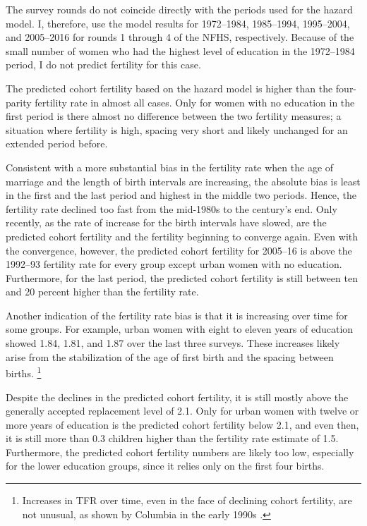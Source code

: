 \documentclass[12pt,letterpaper]{article}
\begin{document}
The survey rounds do not coincide directly with the periods used for the hazard model.
I, therefore, use the model results for 1972--1984, 1985--1994, 1995--2004,
and 2005--2016 for rounds 1 through 4 of the NFHS, respectively.
Because of the small number of women who had the highest level of education in the
1972--1984 period, I do not predict fertility for this case.

The predicted cohort fertility based on the hazard model is higher than the four-parity 
fertility rate in almost all cases.
Only for women with no education in the first period is there almost no difference 
between the two fertility measures; a situation where fertility is high, spacing
very short and likely unchanged for an extended period before.

Consistent with a more substantial bias in the fertility rate when the age of marriage 
and the length of birth intervals are increasing, the absolute bias is least in the first and the last 
period and highest in the middle two periods.
Hence, the fertility rate declined too fast from the mid-1980s to the century's end.
Only recently, as the rate of increase for the birth intervals have
slowed, are the predicted cohort fertility and the fertility beginning
to converge again.
Even with the convergence, however, the predicted cohort fertility for 2005--16 is 
above the 1992--93 fertility rate for every group except urban women with no education.
Furthermore, for the last period, the predicted cohort fertility is still between ten
and 20 percent higher than the fertility rate. 

Another indication of the fertility rate bias is that it is increasing over time for some 
groups.
For example, urban women with eight to eleven years of education showed 1.84, 1.81, and
1.87 over the last three surveys.
These increases likely arise from the stabilization of the age of first birth and the 
spacing between births.%
\footnote{
Increases in TFR over time, even in the face of declining cohort fertility, are not 
unusual, as shown by Columbia in the early 1990s \citep{Bongaarts1999}.
}

Despite the declines in the predicted cohort fertility, it is still mostly above the 
generally accepted replacement level of 2.1.
Only for urban women with twelve or more years of education is the predicted cohort
fertility below 2.1, and even then, it is still more than 0.3 children higher than the 
fertility rate estimate of 1.5.
Furthermore, the predicted cohort fertility numbers are likely too low,
especially for the lower education groups, since it relies only on the
first four births.
\end{document}
